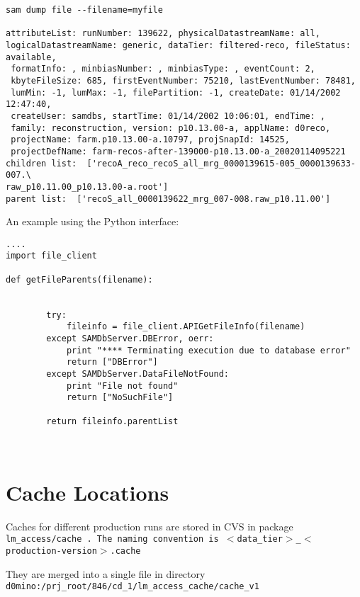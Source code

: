 \documentclass[12pt]{article}
\begin{document}
\begin{verbatim}
sam dump file --filename=myfile

attributeList: runNumber: 139622, physicalDatastreamName: all,
logicalDatastreamName: generic, dataTier: filtered-reco, fileStatus: available,
 formatInfo: , minbiasNumber: , minbiasType: , eventCount: 2,
 kbyteFileSize: 685, firstEventNumber: 75210, lastEventNumber: 78481,
 lumMin: -1, lumMax: -1, filePartition: -1, createDate: 01/14/2002 12:47:40,
 createUser: samdbs, startTime: 01/14/2002 10:06:01, endTime: ,
 family: reconstruction, version: p10.13.00-a, applName: d0reco,
 projectName: farm.p10.13.00-a.10797, projSnapId: 14525,
 projectDefName: farm-recos-after-139000-p10.13.00-a_20020114095221
children list:  ['recoA_reco_recoS_all_mrg_0000139615-005_0000139633-007.\
raw_p10.11.00_p10.13.00-a.root']
parent list:  ['recoS_all_0000139622_mrg_007-008.raw_p10.11.00']
\end{verbatim}

An example using the Python interface:
\begin{verbatim}
....
import file_client

def getFileParents(filename):


        try:
            fileinfo = file_client.APIGetFileInfo(filename)
        except SAMDbServer.DBError, oerr:
            print "**** Terminating execution due to database error"
            return ["DBError"]
        except SAMDbServer.DataFileNotFound:
            print "File not found"
            return ["NoSuchFile"]

        return fileinfo.parentList



\end{verbatim}
\section {Cache Locations}

Caches for different production runs are stored in CVS in package \tt
lm\_access/cache \rm.  The naming convention is
\tt$<$data\_tier$>$\_$<$production-version$>$.cache \rm

They are merged into a single file in directory \tt
d0mino:/prj\_root/846/cd\_1/lm\_access\_cache/cache\_v1 \rm




\newpage
% 
%

 
\end{document}
